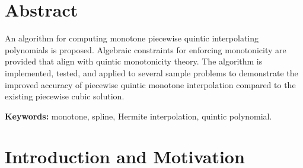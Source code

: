 \documentclass{scspaperproc}
\theoremstyle{scsthe}
\begin{document}
\maketitle



\section*{Abstract}

An algorithm for computing monotone piecewise quintic interpolating
polynomials is proposed. Algebraic constraints for enforcing
monotonicity are provided that align with quintic monotonicity
theory. The algorithm is implemented, tested, and applied to several
sample problems to demonstrate the improved accuracy of piecewise
quintic monotone interpolation compared to the existing piecewise
cubic solution.

\textbf{Keywords:} monotone, spline, Hermite interpolation, quintic polynomial.


\section{Introduction and Motivation}
\label{sec:introduction}


\end{document}
